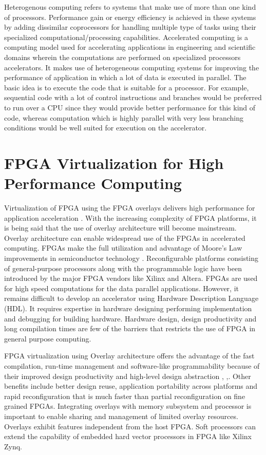 Heterogenous computing refers to systems that make use of more than one kind of processors. Performance gain or energy efficiency is achieved in these systems by adding dissimilar coprocessors for handling multiple type of tasks using their specialized computational/processing capabilities. Accelerated computing is a computing model used for accelerating applications in engineering and scientific domains wherein the computations are performed on specialized processors accelerators. It makes use of heterogeneous computing systems for improving the performance of application in which a lot of data is executed in parallel. The basic idea is to execute the code that is suitable for a processor. For example, sequential code with a lot of control instructions and branches would be preferred to run over a CPU since they would provide better performance for this kind of code, whereas computation which is highly parallel with very less branching conditions would be well suited for execution on the accelerator.


\section{FPGA Virtualization for High Performance Computing}

Virtualization of FPGA using the FPGA overlays delivers high performance for application acceleration \cite{4}. With the increasing complexity of FPGA platforms, it is being said that the use of overlay architecture will become mainstream. Overlay architecture can enable widespread use of the FPGAs in accelerated computing. FPGAs make the full utilization and advantage of Moore's Law improvements in semiconductor technology \cite{5}. Reconfigurable platforms consisting of general-purpose processors along with the programmable logic have been introduced by the major FPGA vendors like Xilinx and Altera. FPGAs are used for high speed computations for the data parallel applications. However, it remains difficult to develop an accelerator using Hardware Description Language (HDL). It requires expertise in hardware designing performing implementation and debugging for building hardware. Hardware design, design productivity and long compilation times are few of the barriers that restricts the use of FPGA in general purpose computing.

FPGA virtualization using Overlay architecture offers the advantage of the fast compilation, run-time management and software-like programmability because of their improved design productivity and high-level design abstraction \cite{6}, \cite{7},\cite{8}. Other benefits include better design reuse, application portability across platforms and rapid reconfiguration that is much faster than partial reconfiguration on fine grained FPGAs. Integrating overlays with memory subsystem and processor is important to enable sharing and management of limited overlay resources. Overlays exhibit features independent from the host FPGA. Soft processors can extend the capability of embedded hard vector processors in FPGA like Xilinx Zynq.

